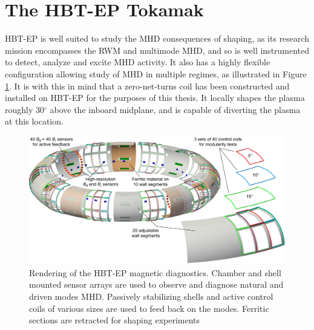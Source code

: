 \documentclass[aps,preprint,showpacs,superscriptaddress,groupedaddress]{revtex4}  %
\begin{document}

\section{The HBT-EP Tokamak}
	HBT-EP is well suited to study the MHD consequences of shaping, as its research mission encompasses the RWM and multimode MHD, and so is well instrumented to detect, analyze and excite MHD activity.  It also has a highly flexible configuration allowing study of MHD in multiple regimes, as illustrated in Figure \ref{schematic}. It is with this in mind that a zero-net-turns coil has been constructed and installed on HBT-EP for the purposes of this thesis.  It locally shapes the plasma roughly 30${^\circ}$ above the inboard midplane, and is capable of diverting the plasma at this location.
	\begin{figure}[htb]
	\centering
	\includegraphics[scale=.25]{../Plots/Plasma_with_sensors_FWall_concept_WithCCview.png}
	\caption{Rendering of the HBT-EP magnetic diagnostics.  Chamber and shell mounted sensor arrays are used to observe and diagnose natural and driven modes MHD.  Passively stabilizing shells and active control coils of various sizes are used to feed back on the modes.  Ferritic sections are retracted for shaping experiments}
	\label{schematic}
	\end{figure}
	
\end{document}
